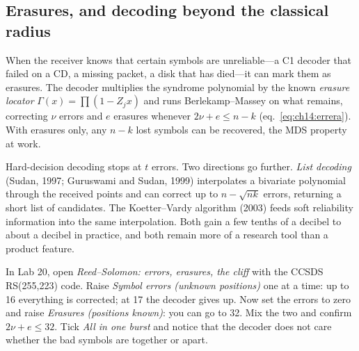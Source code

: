 \subsection{Erasures, and decoding beyond the classical radius}

When the receiver knows that certain symbols are unreliable---a C1 decoder that failed on a CD, a
missing packet, a disk that has died---it can mark them as erasures. The decoder multiplies the
syndrome polynomial by the known \emph{erasure locator} $\Gamma(x)=\prod(1-Z_jx)$ and runs
Berlekamp--Massey on what remains, correcting $\nu$ errors and $e$ erasures whenever
$2\nu+e\le n-k$ (eq.~\ref{eq:ch14:errera}). With erasures only, any $n-k$ lost symbols can be
recovered, the MDS property at work.

Hard-decision decoding stops at $t$ errors. Two directions go further. \emph{List decoding} (Sudan,
1997; Guruswami and Sudan, 1999) interpolates a bivariate polynomial through the received points
and can correct up to $n-\sqrt{nk}$ errors, returning a short list of candidates. The
Koetter--Vardy algorithm (2003) feeds soft reliability information into the same interpolation.
Both gain a few tenths of a decibel to about a decibel in practice, and both remain more of a
research tool than a product feature.

\begin{tryit}
In Lab 20, open \emph{Reed--Solomon: errors, erasures, the cliff} with the CCSDS RS(255,223) code.
Raise \emph{Symbol errors (unknown positions)} one at a time: up to 16 everything is corrected; at 17
the decoder gives up. Now set the errors to zero and raise \emph{Erasures (positions known)}: you can
go to 32. Mix the two and confirm $2\nu+e\le32$. Tick \emph{All in one burst} and notice that the
decoder does not care whether the bad symbols are together or apart.
\end{tryit}


